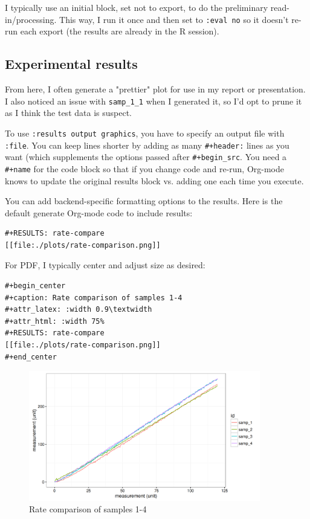 \documentclass[11pt]{article}
\begin{document}
I typically use an initial block, set not to export, to do the preliminary
read-in/processing. This way, I run it once and then set to \texttt{:eval no} so it doesn't
re-run each export (the results are already in the R session).

\subsection*{Experimental results}
\label{sec:orgheadline12}

From here, I often generate a "prettier" plot for use in my report or presentation. I also
noticed an issue with \texttt{samp\_1\_1} when I generated it, so I'd opt to prune it as I think the
test data is suspect.

To use \texttt{:results output graphics}, you  have to specify an output file with \texttt{:file}. You
can keep lines shorter by adding as many \texttt{\#+header:} lines as you want (which supplements
the options passed after \texttt{\#+begin\_src}. You need a \texttt{\#+name} for the code block so that if
you change code and re-run, Org-mode knows to update the original results block vs. adding
one each time you execute.

You can add backend-specific formatting options to the results. Here is the default
generate Org-mode code to include results:

\begin{verbatim}
#+RESULTS: rate-compare
[[file:./plots/rate-comparison.png]]
\end{verbatim}

For PDF, I typically center and adjust size as desired:

\begin{verbatim}
#+begin_center
#+caption: Rate comparison of samples 1-4
#+attr_latex: :width 0.9\textwidth
#+attr_html: :width 75%
#+RESULTS: rate-compare
[[file:./plots/rate-comparison.png]]
#+end_center
\end{verbatim}

\begin{center}
\begin{figure}[htb]
\centering
\includegraphics[width=0.9\textwidth]{./plots/rate-comparison.png}
\caption{Rate comparison of samples 1-4}
\end{figure}
\end{center}
\end{document}
